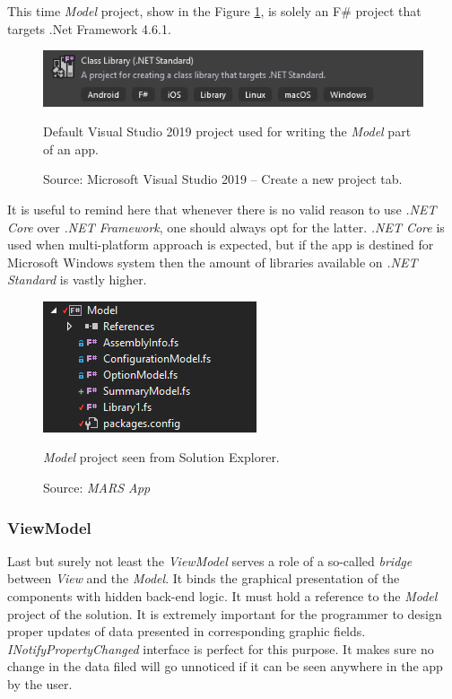         This time \textit{Model} project, show in the Figure \ref{fig:model_VS19Project}, is solely an F\# project that targets .Net Framework 4.6.1.
        \begin{figure}[H]
            \centering
            \includegraphics{img/model_VS19Project.png}
            \caption{Default Visual Studio 2019 project used for writing the \textit{Model} part of an app.}
            \caption*{Source: Microsoft Visual Studio 2019 -- Create a new project tab.}
            \label{fig:model_VS19Project}
        \end{figure}
        
        It is useful to remind here that whenever there is no valid reason to use \textit{.NET Core} over \textit{.NET Framework}, one should always opt for the latter. \textit{.NET Core} is used when multi-platform approach is expected, but if the app is destined for Microsoft Windows system then the amount of libraries available on \textit{.NET Standard} is vastly higher.
        
        \begin{figure}[H]
            \centering
            \includegraphics{img/model.png}
            \caption{\textit{Model} project seen from Solution Explorer.}
            \caption*{Source: \textit{MARS App}}
            \label{fig:model}
        \end{figure} 
        
    \subsubsection{ViewModel}    
        Last but surely not least the \textit{ViewModel} serves a role of a so-called \textit{bridge} between \textit{View} and the \textit{Model}. It binds the graphical presentation of the components with hidden back-end logic. It must hold a reference to the \textit{Model} project of the solution. It is extremely important for the programmer to design proper updates of data presented in corresponding graphic fields. \textit{INotifyPropertyChanged} interface is perfect for this purpose. It makes sure no change in the data filed will go unnoticed if it can be seen anywhere in the app by the user.
        
